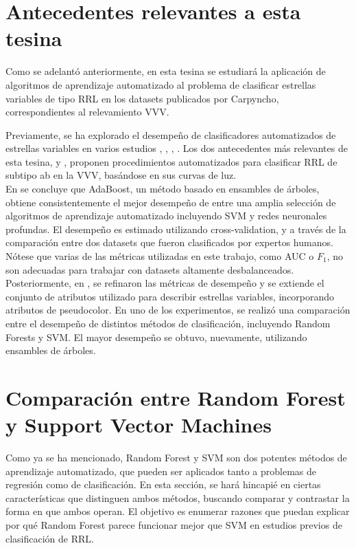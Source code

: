 \section{Antecedentes relevantes a esta tesina}

\par Como se adelantó anteriormente, en esta tesina se estudiará la aplicación de algoritmos de aprendizaje automatizado al problema de clasificar estrellas variables de tipo RRL en los datasets publicados por Carpyncho, correspondientes al relevamiento VVV. \\

\par Previamente, se ha explorado el desempeño de clasificadores automatizados de estrellas variables en varios estudios \cite{ej1}, \cite{ej2}, \cite{ej3}, \cite{ej4}.  Los dos antecedentes más relevantes de esta tesina, \cite{elorrieta} y \cite{jbc}, proponen procedimientos automatizados para clasificar RRL de subtipo ab en la VVV, basándose en sus curvas de luz. \\

En \cite{elorrieta} se concluye que AdaBoost\cite{adaboost}, un método basado en ensambles de árboles, obtiene consistentemente el mejor desempeño de entre una amplia selección de algoritmos de aprendizaje automatizado incluyendo SVM y redes neuronales profundas. El desempeño es estimado utilizando cross-validation, y a través de la comparación entre dos datasets que fueron clasificados por expertos humanos. Nótese que varias de las métricas utilizadas en este trabajo, como AUC o $F_1$, no son adecuadas para trabajar con datasets altamente desbalanceados. \\

Posteriormente, en \cite{jbc}, se refinaron las métricas de desempeño y se extiende el conjunto de atributos utilizado para describir estrellas variables, incorporando atributos de pseudocolor. En uno de los experimentos, se realizó una comparación entre el desempeño de distintos métodos de clasificación, incluyendo Random Forests y SVM. El mayor desempeño se obtuvo, nuevamente, utilizando ensambles de árboles.


\section{ Comparación entre Random Forest y Support Vector Machines}

Como ya se ha mencionado, Random Forest y SVM son dos potentes métodos de aprendizaje automatizado, que pueden ser aplicados tanto a problemas de regresión como de clasificación. En esta sección, se hará hincapié en ciertas características que distinguen ambos métodos, buscando comparar y contrastar la forma en que ambos operan. El objetivo es enumerar razones que puedan explicar por qué Random Forest parece funcionar mejor que SVM en estudios previos de clasificación de RRL.\\


